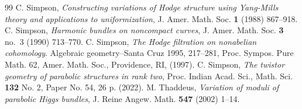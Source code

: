 \documentclass[12pt,a4paper]{amsart}
\theoremstyle{definition}
\theoremstyle{remark}
\begin{document}
\begin{thebibliography}{99}
 C. Simpson, {\em Constructing variations of Hodge structure using Yang-Mills theory and applications to
uniformization},  J. Amer. Math. Soc. \textbf{1} (1988) 867--918.
 C. Simpson, {\em Harmonic bundles on noncompact curves}, J. Amer. Math. Soc. \textbf{3} no.~3 (1990) 713--770.
 C. Simpson, {\em  The Hodge filtration on nonabelian cohomology}. Algebraic geometry--Santa Cruz 1995, 217--281, Proc. Sympos. Pure Math. 62, Amer. Math. Soc., Providence, RI, (1997).
 C. Simpson, {\em The twistor geometry of parabolic structures in rank two}, Proc. Indian Acad. Sci., Math. Sci. \textbf{132} No. 2, Paper No. 54, 26 p. (2022).
M. Thaddeus, {\em Variation of moduli of parabolic Higgs bundles}, J. Reine Angew. Math. \textbf{547} (2002) 1--14.
\end{thebibliography}
\end{document}
